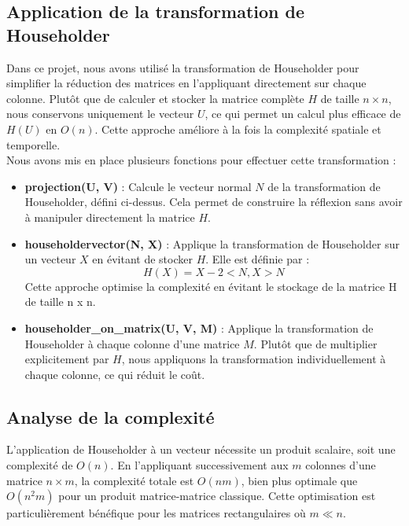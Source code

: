 \documentclass{article}
\begin{document}
\subsection{Application de la transformation de Householder}

Dans ce projet, nous avons utilisé la transformation de Householder pour simplifier la réduction des matrices en l'appliquant directement sur chaque colonne. Plutôt que de calculer et stocker la matrice complète \( H \) de taille \( n \times n \), nous conservons uniquement le vecteur \( U \), ce qui permet un calcul plus efficace de \( H(U) \) en \( O(n) \). Cette approche améliore à la fois la complexité spatiale et temporelle.\\
Nous avons mis en place plusieurs fonctions pour effectuer cette transformation :

\begin{itemize}
    \item \textbf{projection(U, V)} : Calcule le vecteur normal \( N \) de la transformation de Householder, défini ci-dessus.
    Cela permet de construire la réflexion sans avoir à manipuler directement la matrice \( H \).

    \item \textbf{householdervector(N, X)} : Applique la transformation de Householder sur un vecteur \( X \) en évitant de stocker \( H \). Elle est définie par :
    \[
    H(X) = X - 2 <N,X> N
    \]
    Cette approche optimise la complexité en évitant le stockage de la matrice H de taille n x n.

    \item \textbf{householder\_on\_matrix(U, V, M)} : Applique la transformation de Householder à chaque colonne d'une matrice \( M \). Plutôt que de multiplier explicitement par \( H \), nous appliquons la transformation individuellement à chaque colonne, ce qui réduit le coût.
\end{itemize}

\subsection{Analyse de la complexité}

L'application de Householder à un vecteur nécessite un produit scalaire, soit une complexité de \( O(n) \). En l'appliquant successivement aux \( m \) colonnes d'une matrice \( n \times m \), la complexité totale est \( O(nm) \), bien plus optimale que \( O(n^2 m) \) pour un produit matrice-matrice classique. Cette optimisation est particulièrement bénéfique pour les matrices rectangulaires où \( m \ll n \).
\end{document}
